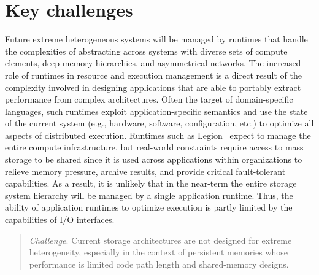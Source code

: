 \documentclass{sig-alternate-05-2015}
\begin{document}

\date{30 July 1999}

\maketitle

\section{Key challenges}

Future extreme heterogeneous systems will be managed by runtimes that handle the
complexities of abstracting across systems with diverse sets of compute
elements, deep memory hierarchies, and asymmetrical networks.  The increased
role of runtimes in resource and execution management is a direct result of the
complexity involved in designing applications that are able to portably extract
performance from complex architectures.  Often the target of domain-specific
languages, such runtimes exploit application-specific semantics and use the
state of the current system (e.g., hardware, software, configuration, etc.) to
optimize all aspects of distributed execution. Runtimes such as Legion~\cite{bauer:sc12-legion}
expect to manage the entire compute infrastructure, but real-world constraints
require access to mass storage to be shared since it is used across applications
within organizations to relieve memory pressure, archive results, and provide
critical fault-tolerant capabilities. As a result, it is unlikely that in the
near-term the entire storage system hierarchy will be managed by a single
application runtime. Thus, the ability of application runtimes to optimize
execution is partly limited by the capabilities of I/O interfaces.

\begin{quote}
  \emph{Challenge}. Current storage architectures are not designed for extreme
  heterogeneity, especially in the context of persistent memories whose
  performance is limited code path length and shared-memory designs.
\end{quote}
\end{document}
